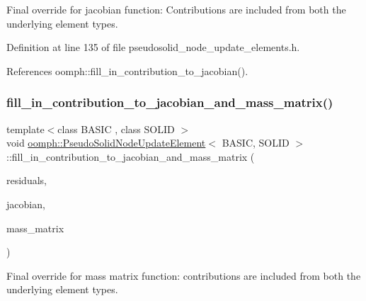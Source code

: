Final override for jacobian function\+: Contributions are included from both the underlying element types. 



Definition at line 135 of file pseudosolid\+\_\+node\+\_\+update\+\_\+elements.\+h.



References oomph\+::fill\+\_\+in\+\_\+contribution\+\_\+to\+\_\+jacobian().

\mbox{\label{classoomph_1_1PseudoSolidNodeUpdateElement_aba0869b0de889df9be90647c28632f8b}} 
\subsubsection{\texorpdfstring{fill\+\_\+in\+\_\+contribution\+\_\+to\+\_\+jacobian\+\_\+and\+\_\+mass\+\_\+matrix()}{fill\_in\_contribution\_to\_jacobian\_and\_mass\_matrix()}}
{\footnotesize\ttfamily template$<$class B\+A\+S\+IC , class S\+O\+L\+ID $>$ \\
void \hyperlink{classoomph_1_1PseudoSolidNodeUpdateElement}{oomph\+::\+Pseudo\+Solid\+Node\+Update\+Element}$<$ B\+A\+S\+IC, S\+O\+L\+ID $>$\+::fill\+\_\+in\+\_\+contribution\+\_\+to\+\_\+jacobian\+\_\+and\+\_\+mass\+\_\+matrix (\begin{DoxyParamCaption}\item[{\hyperlink{classoomph_1_1Vector}{Vector}$<$ double $>$ \&}]{residuals,  }\item[{\hyperlink{classoomph_1_1DenseMatrix}{Dense\+Matrix}$<$ double $>$ \&}]{jacobian,  }\item[{\hyperlink{classoomph_1_1DenseMatrix}{Dense\+Matrix}$<$ double $>$ \&}]{mass\+\_\+matrix }\end{DoxyParamCaption})\hspace{0.3cm}{\ttfamily [inline]}}



Final override for mass matrix function\+: contributions are included from both the underlying element types. 



